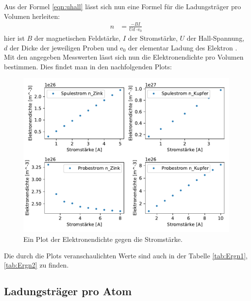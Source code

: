    \noindent
    Aus der Formel \ref{eqn:uhall} lässt sich nun eine Formel für die Ladungsträger pro Volumen herleiten:
    \begin{align}
        n &= \frac{-BI}{Ud\cdot\text{e}_0} \nonumber
    \end{align}
    hier ist $B$ der magnetischen Feldstärke, $I$ der Stromstärke, $U$ der Hall-Spannung, $d$ der Dicke der jeweiligen Proben und $\text{e}_0$ der 
    elementar Ladung des Elektron \cite{e0}.
    \noindent
    Mit den angegeben Messwerten lässt sich nun die Elektronendichte pro Volumen bestimmen. Dies findet man in den nachfolgenden Plots:
    \begin{figure}[H]
        \centering
        \includegraphics[width=1.1\textwidth]{build/N.pdf}
        \caption{Ein Plot der Elektronendichte gegen die Stromstärke.}
        \label{img:elekdichte}
    \end{figure}
    \noindent
    Die durch die Plots veranschaulichten Werte sind auch in der Tabelle \ref{tab:Ergn1},\ref{tab:Ergn2} zu finden.


    \subsection{Ladungsträger pro Atom}


